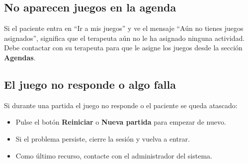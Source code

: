 \subsection{No aparecen juegos en la agenda}

Si el paciente entra en ``Ir a mis juegos'' y ve el mensaje ``Aún no tienes juegos asignados'', significa que el terapeuta aún no le ha asignado ninguna actividad. Debe contactar con su terapeuta para que le asigne los juegos desde la sección \textbf{Agendas}.

\subsection{El juego no responde o algo falla}

Si durante una partida el juego no responde o el paciente se queda atascado:

\begin{itemize}
    \item Pulse el botón \textbf{Reiniciar} o \textbf{Nueva partida} para empezar de nuevo.
    \item Si el problema persiste, cierre la sesión y vuelva a entrar.
    \item Como último recurso, contacte con el administrador del sistema.
\end{itemize}
